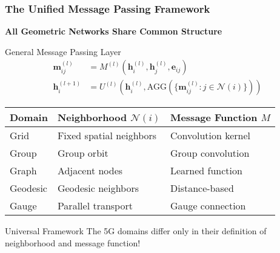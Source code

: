 \begin{frame}[fragile]\frametitle{The Unified Message Passing Framework}

\begin{center}
\textbf{All Geometric Networks Share Common Structure}
\end{center}

\begin{block}{General Message Passing Layer}
\begin{align}
\mathbf{m}_{ij}^{(l)} &= M^{(l)}(\mathbf{h}_i^{(l)}, \mathbf{h}_j^{(l)}, \mathbf{e}_{ij}) \\
\mathbf{h}_i^{(l+1)} &= U^{(l)}\left(\mathbf{h}_i^{(l)}, \text{AGG}\left(\{\mathbf{m}_{ij}^{(l)} : j \in \mathcal{N}(i)\}\right)\right)
\end{align}
\end{block}

\begin{center}
\begin{tabular}{|l|l|l|}
\hline
\textbf{Domain} & \textbf{Neighborhood $\mathcal{N}(i)$} & \textbf{Message Function $M$} \\
\hline
Grid & Fixed spatial neighbors & Convolution kernel \\
Group & Group orbit & Group convolution \\
Graph & Adjacent nodes & Learned function \\
Geodesic & Geodesic neighbors & Distance-based \\
Gauge & Parallel transport & Gauge connection \\
\hline
\end{tabular}
\end{center}

\begin{alertblock}{Universal Framework}
The 5G domains differ only in their definition of neighborhood and message function!
\end{alertblock}

\end{frame}

